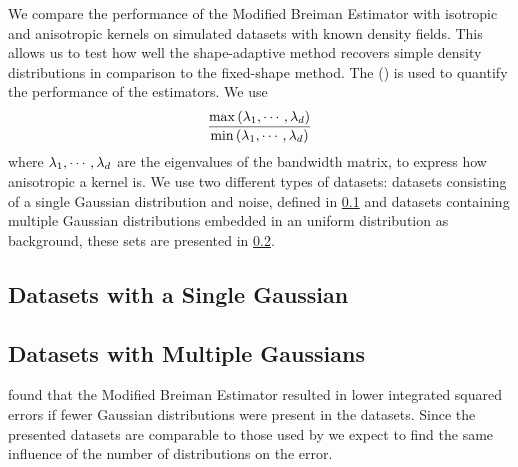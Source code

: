 We compare the performance of the Modified Breiman Estimator with isotropic and anisotropic kernels on simulated datasets with known density fields. This allows us to test how well the shape-adaptive method recovers simple density distributions in comparison to the fixed-shape method. 
The \mse (\MSE) is used to quantify the performance of the estimators. We use
\begin{equation*}\label{eq:experiment:anisotropicmetric}
	\frac{\max\left(\lambda_1, \cdots, \lambda_d \right)}{\min\left(\lambda_1, \cdots, \lambda_d \right)}
\end{equation*}
where $\lambda_1, \cdots, \lambda_d$ are the eigenvalues of the bandwidth matrix, to express how anisotropic a kernel is.
We use two different types of datasets: datasets consisting of a single Gaussian distribution and noise, defined in \cref{s:experiment:singlesphere} and datasets containing multiple Gaussian distributions embedded in an uniform distribution as background, these sets are presented in \cref{s:experiment:multisphere}.

\subsection{Datasets with a Single Gaussian}
\label{s:experiment:singlesphere}


\subsection{Datasets with Multiple Gaussians}
\label{s:experiment:multisphere}


\textcite{ferdosi2011comparison} found that the Modified Breiman Estimator resulted in lower integrated squared errors if fewer Gaussian distributions were present in the datasets. Since the presented datasets are comparable to those used by \citeauthor{ferdosi2011comparison} we expect to find the same influence of the number of distributions on the error.
